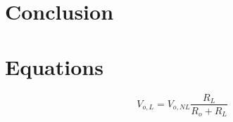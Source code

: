 
\section{Conclusion}
\label{sec:conclusion}


\section{Equations}
\label{sec:equations}

%
\begin{equation}
  \label{eq:amp}
  V_{o,L} = V_{o,NL} \frac{R_L}{R_o + R_L}
\end{equation}
%


